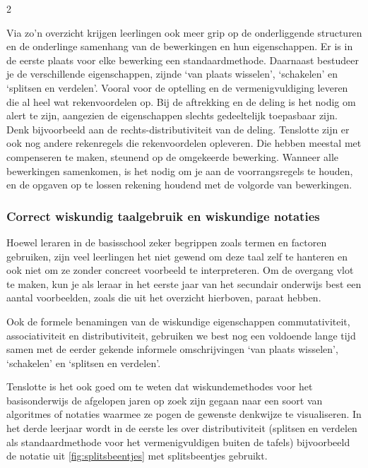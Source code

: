 \begin{multicols}{2}

Via zo'n overzicht krijgen leerlingen ook meer grip op de onderliggende structuren en de onderlinge samenhang van de bewerkingen en hun eigenschappen.
Er is in de eerste plaats voor elke bewerking een standaardmethode.
Daarnaast bestudeer je de verschillende eigenschappen, zijnde `van plaats wisselen', `schakelen' en `splitsen en verdelen'.
Vooral voor de optelling en de vermenigvuldiging leveren die al heel wat rekenvoordelen op.
Bij de aftrekking en de deling is het nodig om alert te zijn, aangezien de eigenschappen slechts gedeeltelijk toepasbaar zijn. Denk bijvoorbeeld aan de rechts-distributiviteit van de deling.
Tenslotte zijn er ook nog andere rekenregels die rekenvoordelen opleveren.
Die hebben meestal met compenseren te maken, steunend op de omgekeerde bewerking.
Wanneer alle bewerkingen samenkomen, is het nodig om je aan de voorrangsregels te houden, en de opgaven op te lossen rekening houdend met de volgorde van bewerkingen.

\subsubsection*{Correct wiskundig taalgebruik en wiskundige notaties}
Hoewel leraren in de basisschool zeker begrippen zoals termen en factoren gebruiken, zijn veel leerlingen het niet gewend om deze taal zelf te hanteren en ook niet om ze zonder concreet voorbeeld te interpreteren.
Om de overgang vlot te maken, kun je als leraar in het eerste jaar van het secundair onderwijs best een aantal voorbeelden, zoals die uit het overzicht hierboven, paraat hebben.

Ook de formele benamingen van de wiskundige eigenschappen commutativiteit, associativiteit en distributiviteit, gebruiken we best nog een voldoende lange tijd samen met de eerder gekende informele omschrijvingen `van plaats wisselen', `schakelen' en `splitsen en verdelen'.

Tenslotte is het ook goed om te weten dat wiskundemethodes voor het basisonderwijs de afgelopen jaren op zoek zijn gegaan naar een soort van algoritmes of notaties waarmee ze pogen de gewenste denkwijze te visualiseren.
In het derde leerjaar wordt in de eerste les over distributiviteit (splitsen en verdelen als standaardmethode voor het vermenigvuldigen buiten de tafels)  bijvoorbeeld de notatie uit \autoref{fig:splitsbeentjes} met splitsbeentjes gebruikt.

\end{multicols}
